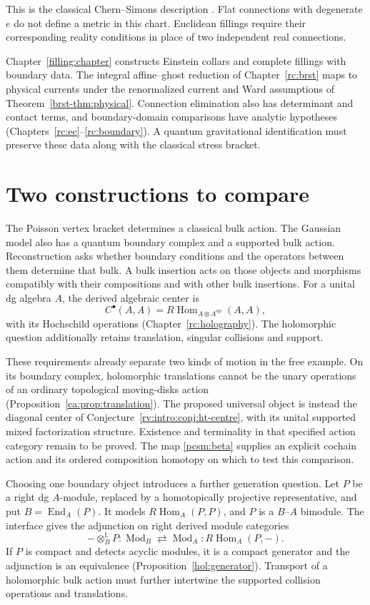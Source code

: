 This is the classical Chern--Simons description
\cites{hol:AT,hol:WittenGravity}.
Flat connections with degenerate \(e\) do not define a metric
in this chart. Euclidean fillings require their corresponding
reality conditions in place of two independent real connections.

Chapter~\ref{filling:chapter} constructs Einstein collars and
complete fillings with boundary data.
The integral affine--ghost reduction of Chapter~\ref{rc:brst}
maps to physical currents under the renormalized current and Ward
assumptions of Theorem~\ref{brst-thm:physical}.
Connection elimination also has determinant and contact terms,
and boundary-domain comparisons have analytic hypotheses
(Chapters~\ref{rc:ec}--\ref{rc:boundary}).
A quantum gravitational identification must preserve these data
along with the classical stress bracket.

\section{Two constructions to compare}
\label{pcsm:reconstruction}

The Poisson vertex bracket determines a classical bulk action. The
Gaussian model also has a quantum boundary complex and a supported
bulk action. Reconstruction asks whether boundary conditions and
the operators between them determine that bulk.
A bulk insertion acts on those objects and morphisms compatibly
with their compositions and with other bulk insertions.
For a unital dg algebra \(A\), the derived algebraic center is
\[
 C^\bullet(A,A)=R\operatorname{Hom}_{A\otimes A^{\mathrm{op}}}(A,A),
\]
with its Hochschild operations (Chapter~\ref{rc:holography}).
The holomorphic question additionally retains translation, singular
collisions and support.

These requirements already separate two kinds of motion in the free
example. On its boundary complex, holomorphic translations cannot
be the unary operations of an ordinary topological moving-disks
action (Proposition~\ref{ca:prop:translation}).
The proposed universal object is instead the diagonal center of
Conjecture~\ref{rv:intro:conj:ht-centre}, with its unital supported
mixed factorization structure. Existence and terminality in that
specified action category remain to be proved.
The map \eqref{pcsm:beta} supplies an explicit cochain action and
its ordered composition homotopy on which to test this comparison.

Choosing one boundary object introduces a further generation question.
Let \(P\) be a right dg \(A\)-module, replaced by a homotopically
projective representative, and put \(B=\operatorname{End}_A(P)\).
It models \(R\operatorname{Hom}_A(P,P)\), and \(P\) is a
\(B\)--\(A\) bimodule. The interface gives the adjunction on
right derived module categories
\[
 -\otimes_B^{\mathbb L}P:\operatorname{Mod}_B
 \rightleftarrows\operatorname{Mod}_A:
 R\operatorname{Hom}_A(P,-).
\]
If \(P\) is compact and detects acyclic modules, it is a compact
generator and the adjunction is an equivalence
(Proposition~\ref{hol:generator}).
Transport of a holomorphic bulk action must further intertwine
the supported collision operations and translations.

